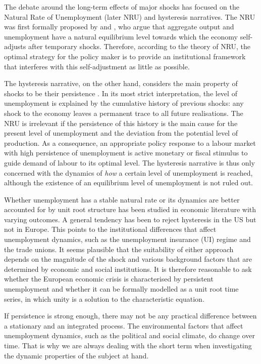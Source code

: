 \documentclass[12pt,a4paper,english]{article}
\begin{document}
The debate around the long-term effects of major shocks has focused on the Natural Rate of Unemployment (later NRU) and hysteresis narratives. The NRU was first formally proposed by \cite{phelps1967} and \cite{friedman1968}, who argue that aggregate output and unemployment have a natural equilibrium level towards which the economy self-adjusts after temporary shocks. Therefore, according to the theory of NRU, the optimal strategy for the policy maker is to provide an institutional framework that interferes with this self-adjustment as little as possible. 

The hysteresis narrative, on the other hand, considers the main property of shocks to be their persistence \citep{blanchard1987}. In its most strict interpretation, the level of unemployment is explained by the cumulative history of previous shocks: any shock to the economy leaves a permanent trace to all future realisations. The NRU is irrelevant if the persistence of this history is the main cause for the present level of unemployment and the deviation from the potential level of production. As a consequence, an appropriate policy response to a labour market with high persistence of unemployment is active monetary or fiscal stimulus to guide demand of labour to its optimal level. The hysteresis narrative is thus only concerned with the dynamics of \textit{how} a certain level of unemployment is reached, although the existence of an equilibrium level of unemployment is not ruled out. 

Whether unemployment has a stable natural rate or its dynamics are better accounted for by unit root structure has been studied in economic literature with varying outcomes. A general tendency has been to reject hysteresis in the US but not in Europe. This points to the institutional differences that affect unemployment dynamics, such as the unemployment insurance (UI) regime and the trade unions. It seems plausible that the suitability of either approach depends on the magnitude of the shock and various background factors that are determined by economic and social institutions. It is therefore reasonable to ask whether the European economic crisis is characterised by persistent unemployment and whether it can be formally modelled as a unit root time series, in which unity is a solution to the characteristic equation.

If persistence is strong enough, there may not be any practical difference between a stationary and an integrated process. The environmental factors that affect unemployment dynamics, such as the political and social climate, do change over time. That is why we are always dealing with the short term when investigating the dynamic properties of the subject at hand.
\end{document}
